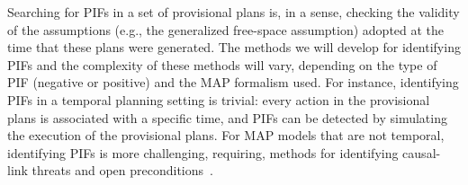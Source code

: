\documentclass[11pt]{article}
\newcommand{\vac}[2]{\textit{Vacuumed(#1,#2)}}
\newcommand{\move}[3]{\textit{Move$_{#1}$(#2,#3)}}
\begin{document}




Searching for PIFs in a set of provisional plans is, in a sense, checking the validity of the assumptions (e.g., the generalized free-space assumption) adopted at the time that these plans were generated. 
The methods we will develop for identifying PIFs and the complexity of these methods will vary, depending on the type of PIF (negative or positive) and the MAP formalism used. For instance, identifying PIFs in a temporal planning setting is trivial: every action in the provisional plans is associated with a specific time, and PIFs can be detected by simulating the execution of the provisional plans.  For MAP models that are not temporal, identifying PIFs is more challenging, requiring, methods for identifying causal-link threats and open preconditions~\cite{cox2009efficient}. 
\end{document}
